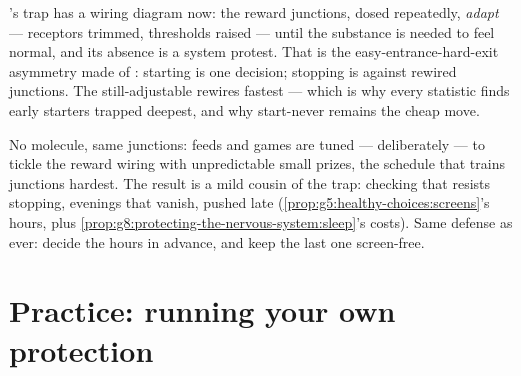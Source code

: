 \begin{remark}\label{rem:g8:protecting-the-nervous-system:addiction}
's trap has a wiring
diagram now: the reward junctions, dosed repeatedly,
\emph{adapt} --- receptors trimmed, thresholds raised ---
until the substance is needed to feel normal, and its
absence is a system protest. That  is the
easy-entrance-hard-exit asymmetry made of :
starting is one decision; stopping is against rewired
junctions. The still-adjustable   rewires
fastest --- which is why every statistic finds early
starters trapped deepest, and why start-never remains the
cheap move.
\end{remark}

\begin{example}\label{ex:g8:protecting-the-nervous-system:screens}
No molecule, same junctions: feeds and games are tuned
--- deliberately --- to tickle the reward wiring with
unpredictable small prizes, the schedule that trains
junctions hardest. The result is a mild cousin of the
trap: checking that resists stopping, evenings that
vanish,  pushed late
(\cref{prop:g5:healthy-choices:screens}'s hours, plus
\cref{prop:g8:protecting-the-nervous-system:sleep}'s
costs). Same defense as ever: decide the hours in
advance, and keep the last one screen-free.
\end{example}

\section{Practice: running your own protection}


